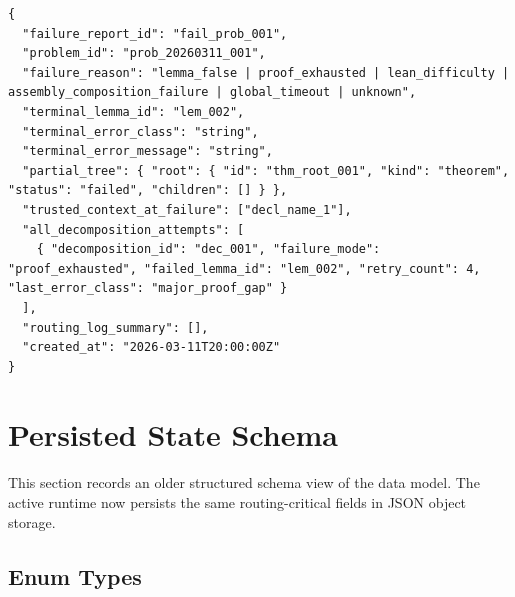 \documentclass[11pt,a4paper]{article}
\begin{document}
\begin{lstlisting}
{
  "failure_report_id": "fail_prob_001",
  "problem_id": "prob_20260311_001",
  "failure_reason": "lemma_false | proof_exhausted | lean_difficulty | assembly_composition_failure | global_timeout | unknown",
  "terminal_lemma_id": "lem_002",
  "terminal_error_class": "string",
  "terminal_error_message": "string",
  "partial_tree": { "root": { "id": "thm_root_001", "kind": "theorem", "status": "failed", "children": [] } },
  "trusted_context_at_failure": ["decl_name_1"],
  "all_decomposition_attempts": [
    { "decomposition_id": "dec_001", "failure_mode": "proof_exhausted", "failed_lemma_id": "lem_002", "retry_count": 4, "last_error_class": "major_proof_gap" }
  ],
  "routing_log_summary": [],
  "created_at": "2026-03-11T20:00:00Z"
}
\end{lstlisting}

\section{Persisted State Schema}
\label{sec:db_schema}

This section records an older structured schema view of the data model. The active runtime now persists the same routing-critical fields in JSON object storage.

\subsection{Enum Types}
\end{document}
